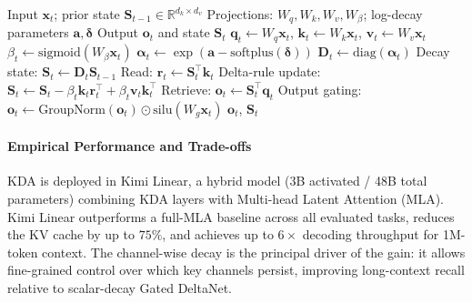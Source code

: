 \begin{algorithm}[H]
\caption{Kimi Delta Attention Recurrent Forward (Reference Form)}
\begin{algorithmic}[1]
\Require Input $\mathbf{x}_t$; prior state $\mathbf{S}_{t-1} \in \mathbb{R}^{d_k \times d_v}$
\Require Projections: $W_q, W_k, W_v, W_\beta$; log-decay parameters $\mathbf{a}, \boldsymbol{\delta}$
\Ensure Output $\mathbf{o}_t$ and state $\mathbf{S}_t$
\State $\mathbf{q}_t \gets W_q \mathbf{x}_t$, $\mathbf{k}_t \gets W_k \mathbf{x}_t$, $\mathbf{v}_t \gets W_v \mathbf{x}_t$
\State $\beta_t \gets \mathrm{sigmoid}(W_\beta \mathbf{x}_t)$ 
\State $\boldsymbol{\alpha}_t \gets \exp(\mathbf{a} - \mathrm{softplus}(\boldsymbol{\delta}))$ 
\State $\mathbf{D}_t \gets \mathrm{diag}(\boldsymbol{\alpha}_t)$ 
\State Decay state: $\mathbf{S}_t \gets \mathbf{D}_t \mathbf{S}_{t-1}$
\State Read: $\mathbf{r}_t \gets \mathbf{S}_t^\top \mathbf{k}_t$ 
\State Delta-rule update: $\mathbf{S}_t \gets \mathbf{S}_t - \beta_t \mathbf{k}_t \mathbf{r}_t^\top + \beta_t \mathbf{v}_t \mathbf{k}_t^\top$
\State Retrieve: $\mathbf{o}_t \gets \mathbf{S}_t^\top \mathbf{q}_t$
\State Output gating: $\mathbf{o}_t \gets \mathrm{GroupNorm}(\mathbf{o}_t) \odot \mathrm{silu}(W_g \mathbf{x}_t)$
\State \Return $\mathbf{o}_t$, $\mathbf{S}_t$
\end{algorithmic}
\end{algorithm}

\paragraph{Empirical Performance and Trade-offs}

KDA is deployed in Kimi Linear, a hybrid model (3B activated / 48B total parameters) combining KDA layers with Multi-head Latent Attention (MLA). Kimi Linear outperforms a full-MLA baseline across all evaluated tasks, reduces the KV cache by up to $75\%$, and achieves up to $6\times$ decoding throughput for 1M-token context. The channel-wise decay is the principal driver of the gain: it allows fine-grained control over which key channels persist, improving long-context recall relative to scalar-decay Gated DeltaNet.

